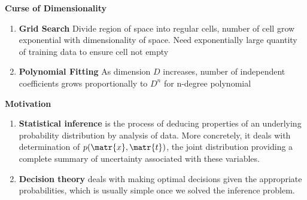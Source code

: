 \documentclass[11pt]{article}
\begin{document}


\begin{defn*}
    \textbf{Curse of Dimensionality} 
    \begin{enumerate}
        \item \textbf{Grid Search} Divide region of space into regular cells, number of cell grow exponential with dimensionality of space. Need exponentially large quantity of training data to ensure cell not empty
        \item \textbf{Polynomial Fitting} As dimension $D$ increases, number of independent coefficients grows proportionally to $D^n$ for n-degree polynomial
    \end{enumerate}
\end{defn*}



\begin{defn*}
    \textbf{Motivation} 
    \begin{enumerate}
        \item \textbf{Statistical inference} is the process of deducing properties of an underlying probability distribution by analysis of data. More concretely, it deals with determination of $p(\matr{x},\matr{t})$, the joint distribution providing a complete summary of uncertainty associated with these variables. 
        \item \textbf{Decision theory} deals with making optimal decisions given the appropriate probabilities, which is usually simple once we solved the inference problem. 
    \end{enumerate}
\end{defn*}
\end{document}

